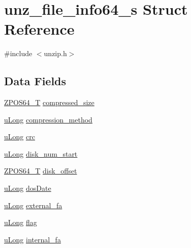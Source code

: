 \hypertarget{structunz__file__info64__s}{}\section{unz\+\_\+file\+\_\+info64\+\_\+s Struct Reference}
\label{structunz__file__info64__s}


{\ttfamily \#include $<$unzip.\+h$>$}

\subsection*{Data Fields}
\begin{DoxyCompactItemize}
\item 
\hyperlink{ioapi_8h_afffed08ed7f2413fa38e12a223ae0e72}{Z\+P\+O\+S64\+\_\+T} \hyperlink{structunz__file__info64__s_afefa321d4008a52a609d437ed4b4e03f}{compressed\+\_\+size}
\item 
\hyperlink{ioapi_8h_a50e9e9d5c30e481de822ad68fe537986}{u\+Long} \hyperlink{structunz__file__info64__s_ac25e6f99bc51d046b8871ddbb4b5f9f7}{compression\+\_\+method}
\item 
\hyperlink{ioapi_8h_a50e9e9d5c30e481de822ad68fe537986}{u\+Long} \hyperlink{structunz__file__info64__s_a3026bf850e727543d9304c8deaf9eb27}{crc}
\item 
\hyperlink{ioapi_8h_a50e9e9d5c30e481de822ad68fe537986}{u\+Long} \hyperlink{structunz__file__info64__s_ad6ed48daf96d59f810a1ef5167ad39db}{disk\+\_\+num\+\_\+start}
\item 
\hyperlink{ioapi_8h_afffed08ed7f2413fa38e12a223ae0e72}{Z\+P\+O\+S64\+\_\+T} \hyperlink{structunz__file__info64__s_af805035ece6428ee6ef82815db92089c}{disk\+\_\+offset}
\item 
\hyperlink{ioapi_8h_a50e9e9d5c30e481de822ad68fe537986}{u\+Long} \hyperlink{structunz__file__info64__s_a96e084f75d7f08f546789a0a4525470f}{dos\+Date}
\item 
\hyperlink{ioapi_8h_a50e9e9d5c30e481de822ad68fe537986}{u\+Long} \hyperlink{structunz__file__info64__s_ac9e0fa204fc992beb62b86163f4736ac}{external\+\_\+fa}
\item 
\hyperlink{ioapi_8h_a50e9e9d5c30e481de822ad68fe537986}{u\+Long} \hyperlink{structunz__file__info64__s_a9432647db394dbfd2a415d6c1184db92}{flag}
\item 
\hyperlink{ioapi_8h_a50e9e9d5c30e481de822ad68fe537986}{u\+Long} \hyperlink{structunz__file__info64__s_a408c5cd87b4894359e91dcab506212cc}{internal\+\_\+fa}
\item 

\end{DoxyCompactItemize}
